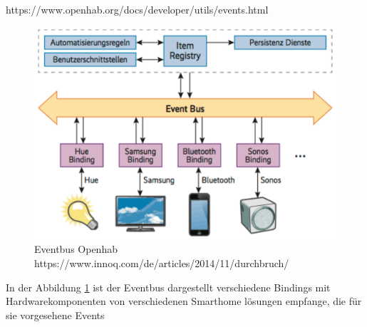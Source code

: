 https://www.openhab.org/docs/developer/utils/events.html
   
  \begin{figure}[H]
 	\centering
 	\includegraphics[width=\textwidth]{graphics/Eventbus.PNG}
 	\caption{Eventbus Openhab https://www.innoq.com/de/articles/2014/11/durchbruch/} 	
 	\label{pic: Eventbus}
 \end{figure} 
 
 In der Abbildung \ref{pic: Eventbus} ist der Eventbus dargestellt verschiedene Bindings mit Hardwarekomponenten von verschiedenen Smarthome lösungen empfange, die für sie vorgesehene Events